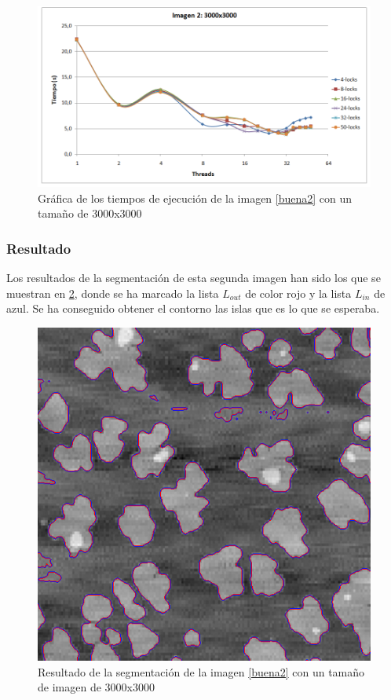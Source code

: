 \begin{figure}[H]
	\captionsetup{justification=centering}
	\centering
	\includegraphics[width=.9\textwidth]{./imagenes/graf2-3000}
	\caption{Gr\'{a}fica de los tiempos de ejecuci\'{o}n de la imagen \ref{buena2} con un tama\~{n}o de 3000x3000}	
	\label{graf2-3000}
\end{figure}


\subsubsection{Resultado}


Los resultados de la segmentaci\'{o}n de esta segunda imagen han sido los que se muestran en \ref{result2}, donde se ha marcado la lista $L_{out}$ de color rojo y la lista $L_{in}$ de azul. Se ha conseguido obtener el contorno las islas que es lo que se esperaba.


\begin{figure}[H]
	\captionsetup{justification=centering}
	\centering
	\includegraphics[width=.7\textwidth]{./imagenes/result2}
	\caption{Resultado de la segmentaci\'{o}n de la imagen \ref{buena2} con un tama\~{n}o de imagen de 3000x3000}	
	\label{result2}
\end{figure}


